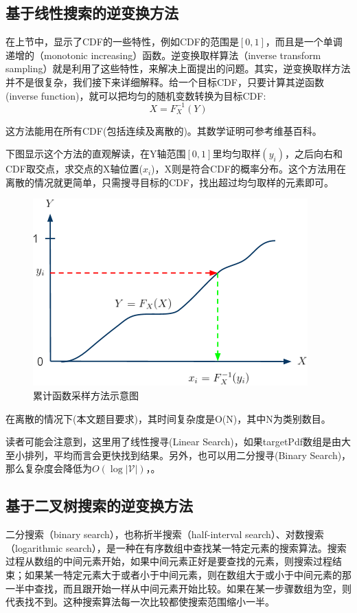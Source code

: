 \subsection{基于线性搜索的逆变换方法}
在上节中，显示了CDF的一些特性，例如CDF的范围是$[0,1]$，而且是一个单调递增的（monotonic increasing）函数。逆变换取样算法（inverse transform sampling）就是利用了这些特性，来解决上面提出的问题。其实，逆变换取样方法并不是很复杂，我们接下来详细解释。给一个目标CDF，只要计算其逆函数(inverse function)，就可以把均匀的随机变数转换为目标CDF:
\begin{equation}\label{equ:func}
  X=F_X^{-1}(Y)
\end{equation}

这方法能用在所有CDF(包括连续及离散的)。其数学证明可参考维基百科。

下图显示这个方法的直观解读，在Y轴范围$[0,1]$里均匀取样$(y_i)$，之后向右和CDF取交点，求交点的X轴位置($x_i$)，X则是符合CDF的概率分布。这个方法用在离散的情况就更简单，只需搜寻目标的CDF，找出超过均匀取样的元素即可。
\begin{figure}[!h]
  \centering
\includegraphics[width=0.5\linewidth]{./figures/cdf.png}
\caption{累计函数采样方法示意图}\label{fig:cdf}
\end{figure}
在离散的情况下(本文题目要求)，其时间复杂度是O(N)，其中N为类别数目。

读者可能会注意到，这里用了线性搜寻(Linear Search)，如果targetPdf数组是由大至小排列，平均而言会更快找到结果。另外，也可以用二分搜寻(Binary Search)，那么复杂度会降低为$O(\log |\mathcal{V}|)$，。


\subsection{基于二叉树搜索的逆变换方法}
二分搜索（binary search），也称折半搜索（half-interval search）、对数搜索（logarithmic search），是一种在有序数组中查找某一特定元素的搜索算法。搜索过程从数组的中间元素开始，如果中间元素正好是要查找的元素，则搜索过程结束；如果某一特定元素大于或者小于中间元素，则在数组大于或小于中间元素的那一半中查找，而且跟开始一样从中间元素开始比较。如果在某一步骤数组为空，则代表找不到。这种搜索算法每一次比较都使搜索范围缩小一半。

